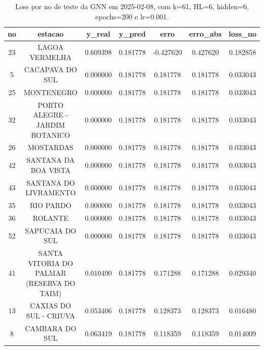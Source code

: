 \begin{table}[h]
\centering
\caption{Loss por no de teste da GNN em 2025-02-08, com k=61, HL=6, hidden=6, epochs=200 e lr=0.001.}
\label{tab:gnn_loss_k61_hl6_h6_e200_d20250208}
\begin{tabular}{ccccccc}
\toprule
no & estacao & y\_real & y\_pred & erro & erro\_abs & loss\_no \\
\midrule
23 & LAGOA VERMELHA & 0.609398 & 0.181778 & -0.427620 & 0.427620 & 0.182858 \\
5 & CACAPAVA DO SUL & 0.000000 & 0.181778 & 0.181778 & 0.181778 & 0.033043 \\
25 & MONTENEGRO & 0.000000 & 0.181778 & 0.181778 & 0.181778 & 0.033043 \\
32 & PORTO ALEGRE - JARDIM BOTANICO & 0.000000 & 0.181778 & 0.181778 & 0.181778 & 0.033043 \\
26 & MOSTARDAS & 0.000000 & 0.181778 & 0.181778 & 0.181778 & 0.033043 \\
42 & SANTANA DA BOA VISTA & 0.000000 & 0.181778 & 0.181778 & 0.181778 & 0.033043 \\
43 & SANTANA DO LIVRAMENTO & 0.000000 & 0.181778 & 0.181778 & 0.181778 & 0.033043 \\
35 & RIO PARDO & 0.000000 & 0.181778 & 0.181778 & 0.181778 & 0.033043 \\
36 & ROLANTE & 0.000000 & 0.181778 & 0.181778 & 0.181778 & 0.033043 \\
52 & SAPUCAIA DO SUL & 0.000000 & 0.181778 & 0.181778 & 0.181778 & 0.033043 \\
41 & SANTA VITORIA DO PALMAR (RESERVA DO TAIM) & 0.010490 & 0.181778 & 0.171288 & 0.171288 & 0.029340 \\
13 & CAXIAS DO SUL - CRIUVA & 0.053406 & 0.181778 & 0.128373 & 0.128373 & 0.016480 \\
8 & CAMBARA DO SUL & 0.063419 & 0.181778 & 0.118359 & 0.118359 & 0.014009 \\
\bottomrule
\end{tabular}
\end{table}
